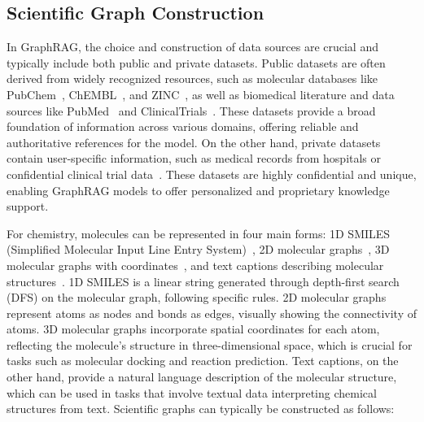 \subsection{ Scientific Graph Construction}
In GraphRAG, the choice and construction of data sources are crucial and typically include both public and private datasets. Public datasets are often derived from widely recognized resources, such as molecular databases like PubChem~\cite{kim2019pubchem}, ChEMBL~\cite{gaulton2012chembl}, and ZINC~\cite{irwin2005zinc}, as well as biomedical literature and data sources like PubMed~\cite{lu2011pubmed} and ClinicalTrials~\cite{zarin2011clinicaltrials}. These datasets provide a broad foundation of information across various domains, offering reliable and authoritative references for the model. 
On the other hand, private datasets contain user-specific information, such as medical records from hospitals or confidential clinical trial data~\cite{wu2024medical}. These datasets are highly confidential and unique, enabling GraphRAG models to offer personalized and proprietary knowledge support. 


For chemistry, molecules can be represented in four main forms: 1D SMILES (Simplified Molecular Input Line Entry System)~\cite{wangretrieval,liu2024moleculargpt}, 2D molecular graphs~\cite{luo2021predicting}, 3D molecular graphs with coordinates~\cite{huanginteraction}, and text captions describing molecular structures~\cite{delile2024graph}.
1D SMILES is a linear string generated through depth-first search (DFS) on the molecular graph, following specific rules.
2D molecular graphs represent atoms as nodes and bonds as edges, visually showing the connectivity of atoms.
3D molecular graphs incorporate spatial coordinates for each atom, reflecting the molecule’s structure in three-dimensional space, which is crucial for tasks such as molecular docking and reaction prediction.
Text captions, on the other hand, provide a natural language description of the molecular structure, which can be used in tasks that involve textual data interpreting chemical structures from text. Scientific graphs can typically be constructed as follows:

